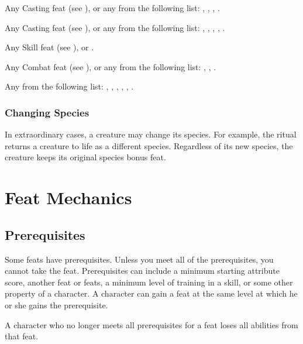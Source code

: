          Any Casting feat (see ), or any from the following list: , , , .

         Any Casting feat (see ), or any from the following list: , , , , .

         Any Skill feat (see ), or .

         Any Combat feat (see ), or any from the following list: , , .

         Any from the following list: , , , , , .

        \subsubsection{Changing Species}
            In extraordinary cases, a creature may change its species.
            For example, the  ritual returns a creature to life as a different species.
            Regardless of its new species, the creature keeps its original species bonus feat.

\section{Feat Mechanics}

    \subsection{Prerequisites}
        Some feats have prerequisites.
        Unless you meet all of the prerequisites, you cannot take the feat.
        Prerequisites can include a minimum starting attribute score, another feat or feats, a minimum level of training in a skill, or some other property of a character.
        A character can gain a feat at the same level at which he or she gains the prerequisite.

        A character who no longer meets all prerequisites for a feat loses all abilities from that feat.

